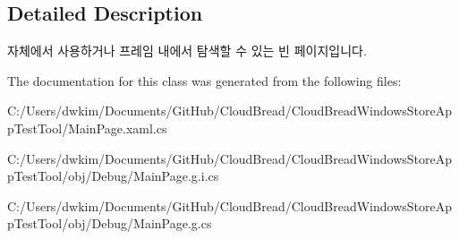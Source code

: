 \subsection{Detailed Description}
자체에서 사용하거나 프레임 내에서 탐색할 수 있는 빈 페이지입니다. 



The documentation for this class was generated from the following files\+:\begin{DoxyCompactItemize}
\item 
C\+:/\+Users/dwkim/\+Documents/\+Git\+Hub/\+Cloud\+Bread/\+Cloud\+Bread\+Windows\+Store\+App\+Test\+Tool/Main\+Page.\+xaml.\+cs\item 
C\+:/\+Users/dwkim/\+Documents/\+Git\+Hub/\+Cloud\+Bread/\+Cloud\+Bread\+Windows\+Store\+App\+Test\+Tool/obj/\+Debug/Main\+Page.\+g.\+i.\+cs\item 
C\+:/\+Users/dwkim/\+Documents/\+Git\+Hub/\+Cloud\+Bread/\+Cloud\+Bread\+Windows\+Store\+App\+Test\+Tool/obj/\+Debug/Main\+Page.\+g.\+cs\end{DoxyCompactItemize}
